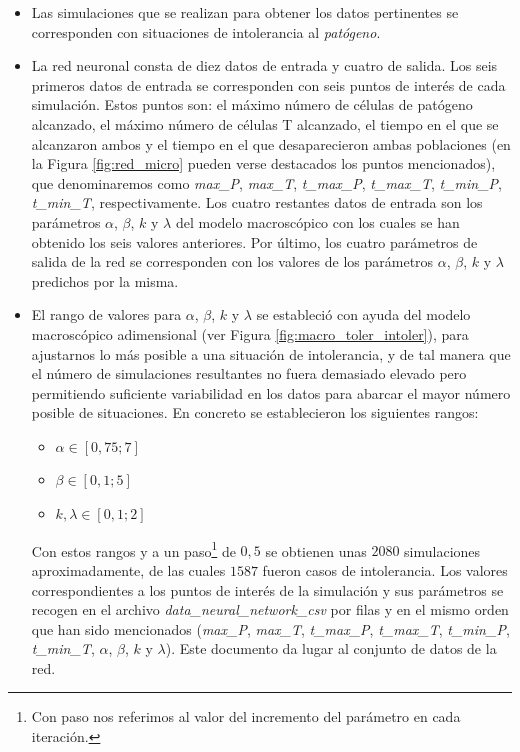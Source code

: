 \begin{itemize}
	\item Las simulaciones que se realizan para obtener los datos pertinentes se corresponden con situaciones de intolerancia al \textit{patógeno}.
	
	\item La red neuronal consta de diez datos de entrada y cuatro de salida. Los seis primeros datos de entrada se corresponden con seis puntos de interés de cada simulación. Estos puntos son: el máximo número de células de patógeno alcanzado, el máximo número de células T alcanzado, el tiempo en el que se alcanzaron ambos y el tiempo en el que desaparecieron ambas poblaciones (en la Figura \ref{fig:red_micro} pueden verse destacados los puntos mencionados), que denominaremos como \textit{max\_P}, \textit{max\_T}, \textit{t\_max\_P}, \textit{t\_max\_T}, \textit{t\_min\_P}, \textit{t\_min\_T}, respectivamente. Los cuatro restantes datos de entrada son los parámetros $\alpha$, $\beta$, $k$ y $\lambda$ del modelo macroscópico con los cuales se han obtenido los seis valores anteriores. Por último, los cuatro parámetros de salida de la red se corresponden con los valores de los parámetros $\alpha$, $\beta$, $k$ y $\lambda$ predichos por la misma.
	
	\item El rango de valores para $\alpha$, $\beta$, $k$ y $\lambda$ se estableció con ayuda del modelo macroscópico adimensional (ver Figura \ref{fig:macro_toler_intoler}), para ajustarnos lo más posible a una situación de intolerancia, y de tal manera que el número de simulaciones resultantes no fuera demasiado elevado pero permitiendo suficiente variabilidad en los datos para abarcar el mayor número posible de situaciones. En concreto se establecieron los siguientes rangos:
	
	\begin{itemize}
		\item $\alpha \in  [0,75;7]$
		\item $\beta \in [0,1;5]$
		\item $k, \lambda \in [0,1;2]$
	\end{itemize}
	
	Con estos rangos y a un paso\footnote{Con paso nos referimos al valor del incremento del parámetro en cada iteración.} de $0,5$ se obtienen unas $2080$ simulaciones aproximadamente, de las cuales $1587$ fueron casos de intolerancia. Los valores correspondientes a los puntos de interés de la simulación y sus parámetros se recogen en el archivo \textit{data\_neural\_network\_csv} por filas y en el mismo orden que han sido mencionados (\textit{max\_P}, \textit{max\_T}, \textit{t\_max\_P}, \textit{t\_max\_T}, \textit{t\_min\_P}, \textit{t\_min\_T}, $\alpha$, $\beta$, $k$ y $\lambda$). Este documento da lugar al conjunto de datos de la red.
	

\end{itemize}
